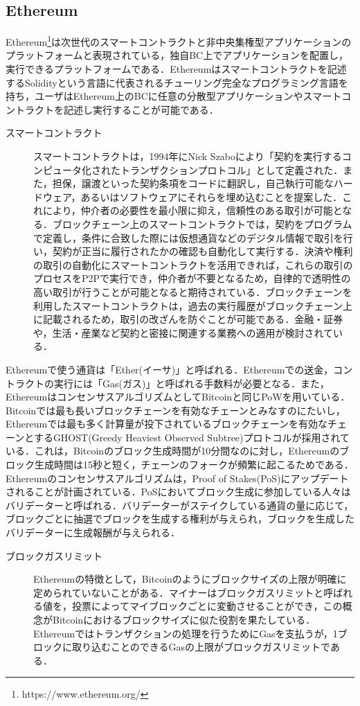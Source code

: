 \documentclass[japanese, macos]{KU2}
\begin{document}
\subsection{Ethereum}
Ethereum\footnote{https://www.ethereum.org/}は次世代のスマートコントラクトと非中央集権型アプリケーションのプラットフォームと表現されている，独自BC上でアプリケーションを配置し，実行できるプラットフォームである．Ethereumはスマートコントラクトを記述するSolidityという言語に代表されるチューリング完全なプログラミング言語を持ち，ユーザはEthereum上のBCに任意の分散型アプリケーションやスマートコントラクトを記述し実行することが可能である．\\
\begin{description}
\item[スマートコントラクト] スマートコントラクトは，1994年にNick Szaboにより「契約を実行するコンピュータ化されたトランザクションプロトコル」として定義された\cite{szabo1994smart}．また，担保，譲渡といった契約条項をコードに翻訳し，自己執行可能なハードウェア，あるいはソフトウェアにそれらを埋め込むことを提案した\cite{szabo1997idea}．これにより，仲介者の必要性を最小限に抑え，信頼性のある取引が可能となる．ブロックチェーン上のスマートコントラクトでは，契約をプログラムで定義し，条件に合致した際には仮想通貨などのデジタル情報で取引を行い，契約が正当に履行されたかの確認も自動化して実行する．決済や権利の取引の自動化にスマートコントラクトを活用できれば，これらの取引のプロセスをP2Pで実行でき，仲介者が不要となるため，自律的で透明性の高い取引が行うことが可能となると期待されている．ブロックチェーンを利用したスマートコントラクトは，過去の実行履歴がブロックチェーン上に記載されるため，取引の改ざんを防ぐことが可能である．金融・証券や，生活・産業など契約と密接に関連する業務への適用が検討されている．
\end{description}

Ethereumで使う通貨は「Ether(イーサ)」と呼ばれる．Ethereumでの送金，コントラクトの実行には「Gas(ガス)」と呼ばれる手数料が必要となる．また，EthereumはコンセンサスアルゴリズムとしてBitcoinと同じPoWを用いている．Bitcoinでは最も長いブロックチェーンを有効なチェーンとみなすのにたいし，Ethereumでは最も多く計算量が投下されているブロックチェーンを有効なチェーンとするGHOST(Greedy Heaviest Observed Subtree)プロトコルが採用されている．これは，Bitcoinのブロック生成時間が10分間なのに対し，Ethereumのブロック生成時間は15秒と短く，チェーンのフォークが頻繁に起こるためである．\\
Ethereumのコンセンサスアルゴリズムは，Proof of Stakes(PoS)にアップデートされることが計画されている．PoSにおいてブロック生成に参加している人々はバリデーターと呼ばれる．バリデーターがステイクしている通貨の量に応じて，ブロックごとに抽選でブロックを生成する権利が与えられ，ブロックを生成したバリデーターに生成報酬が与えられる．
\begin{description}
\item[ブロックガスリミット] Ethereumの特徴として，Bitcoinのようにブロックサイズの上限が明確に定められていないことがある．マイナーはブロックガスリミットと呼ばれる値を，投票によってマイブロックごとに変動させることができ，この概念がBitcoinにおけるブロックサイズに似た役割を果たしている． Ethereumではトランザクションの処理を行うためにGasを支払うが，1ブロックに取り込むことのできるGasの上限がブロックガスリミットである．
\end{description}
\end{document}
